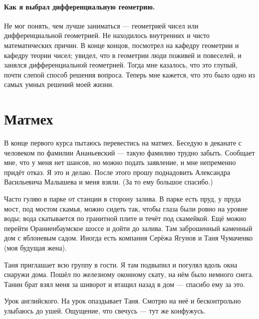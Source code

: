 \documentclass{book}
\begin{document}
\paragraph{Как я выбрал дифференциальную геометрию.}
Не мог понять, чем лучше заниматься --- 
геометрией чисел или дифференциальной геометрией.
Не находилось внутренних и чисто математических причин.
В конце концов, посмотрел на кафедру геометрии и кафедру теории чисел;
увидел, что в геометрии люди поживей и повеселей, и занялся дифференциальной геометрией.
Тогда мне казалось, что это глупый, почти слепой способ решения вопроса.
Теперь мне кажется, что это было одно из самых умных решений моей жизни.


\section*{Матмех}

В конце первого курса пытаюсь перевестись на матмех.
Беседую в деканате с человеком по фамилии Ананьевский ---
такую фамилию трудно забыть.
Сообщает мне,
что у меня нет шансов,
но можно подать заявление, и мне непременно придёт отказ.
Я это и делаю.
После этого прошу поднадовить Александра Васильевича Малышева и меня взяли.
(За то ему большое спасибо.)

Часто гуляю в парке от станции в сторону залива.
В парке есть пруд, у пруда мост, под мостом скамья, 
можно сидеть так, чтобы глаза были ровно на уровне воды;
вода скатывается по гранитной плите и течёт под скамейкой.
Ещё можно перейти Ораниенбаумское шоссе и дойти до залива.
Там заброшенный каменный дом с яблоневым садом.
Иногда есть компания Серёжа Ягунов и Таня Чумаченко (моя будущая жена).

Таня приглашает всю группу в гости.
Я там подвыпил и погулял вдоль окна снаружи дома.
Пошёл по железному оконному скату, 
на нём было немного снега.
Танин брат взял меня за шиворот и втащил назад в дом --- спасибо ему за это.

Урок английского.
На урок опаздывает Таня.
Смотрю на неё и бесконтрольно улыбаюсь до ушей.
Ощущение, что свечусь --- тут же конфужусь.
\end{document}

